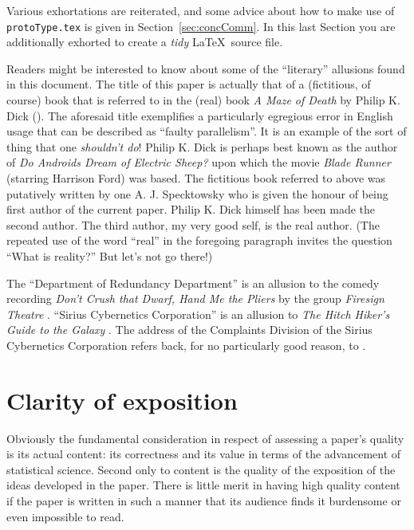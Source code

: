 \documentclass[times, doublespace]{anzsauth}
\begin{document}
Various exhortations are reiterated, and some advice about
how to make use of \texttt{protoType.tex} is given in
Section~\ref{sec:concComm}.  In this last Section you are
additionally exhorted to create a \emph{tidy} \LaTeX\ source file.

Readers might be interested to know about some of the ``literary''
allusions found in this document.  The title of this paper
is actually that of a (fictitious, of course) book that is
referred to in the (real) book \textit{A Maze of Death} by Philip
K. Dick (\citeyear{Dick1971}).  The aforesaid title exemplifies a
particularly egregious error in English usage that can be described
as ``faulty parallelism''.  It is an example of the sort of thing
that one \emph{shouldn't do}!  Philip K. Dick is perhaps best
known as the author of \textit{Do Androids Dream of Electric Sheep?}
\citep{Dick1968} upon which the movie \textit{Blade Runner} (starring
Harrison Ford) was based.  The fictitious book referred to above was
putatively written by one A. J. Specktowsky who is given the honour
of being first author of the current paper.  Philip K. Dick himself
has been made the second author.  The third author, my very good
self, is the real author.  (The repeated use of the word ``real''
in the foregoing paragraph invites the question ``What is reality?''
But let's not go there!)

The ``Department of Redundancy Department'' is an allusion to
the comedy recording \textit{Don't Crush that Dwarf, Hand Me the
Pliers} by the group \textit{Firesign Theatre} \citep{Firesign1970}.
``Sirius Cybernetics Corporation'' is an allusion to \textit{The
Hitch Hiker's Guide to the Galaxy} \citep{Adams1979}.  The address
of the Complaints Division of the Sirius Cybernetics Corporation
refers back, for no particularly good reason, to \cite{Firesign1970}.

\section{Clarity of exposition}
\label{sec:clarExpos}

Obviously the fundamental consideration in respect of assessing a
paper's quality is its actual content: its correctness and its value
in terms of the advancement of statistical science.  Second only to
content is the quality of the exposition of the ideas developed in
the paper.  There is little merit in having high quality content
if the paper is written in such a manner that its audience finds
it burdensome or even impossible to read.
\end{document}

